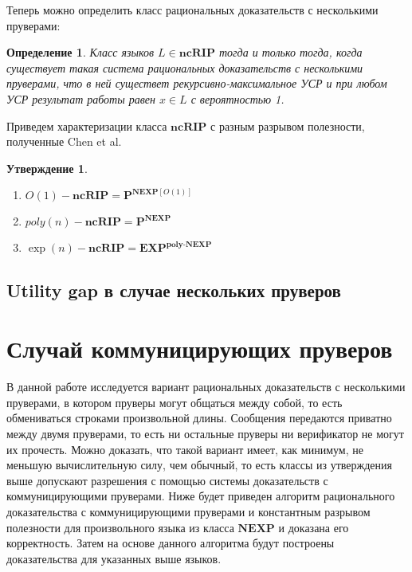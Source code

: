 \documentclass[14pt, a4paper, russian]{report}
\newtheorem{definition}{\indent Определение}
\newtheorem{proposition}{\indent Утверждение}
\begin{document}
        Теперь можно определить класс рациональных доказательств с несколькими пруверами:

        \begin{definition}
            Класс языков $L \in \textbf{ncRIP}$ тогда и только тогда, когда существует такая система рациональных доказательств с несколькими пруверами, что в ней существет рекурсивно-максимальное УСР и при любом УСР результат работы равен $x \in L$ с вероятностью 1.
        \end{definition}

        Приведем характеризации класса $\textbf{ncRIP}$ с разным разрывом полезности, полученные Chen et al. 

        \begin{proposition}
            \begin{enumerate}
                \item $ O(1)-\textbf{ncRIP} = {\textbf{P}}^{\textbf{NEXP}[O(1)] } $
                \item $\textit{poly}(n)-\textbf{ncRIP} = \textbf{P}^{\textbf{NEXP}} $
                \item $\exp(n)-\textbf{ncRIP} = \textbf{EXP}^{\textbf{poly-NEXP}} $
            \end{enumerate}
        \end{proposition}
        \section{Utility gap в случае нескольких пруверов}


        \chapter{Случай коммуницирующих пруверов}

        В данной работе исследуется вариант рациональных доказательств с несколькими пруверами, в котором пруверы могут общаться между собой, то есть обмениваться строками произвольной длины. Сообщения передаются приватно между двумя пруверами, то есть ни остальные пруверы ни верификатор не могут их прочесть. Можно доказать, что такой вариант имеет, как минимум, не меньшую вычислительную силу, чем обычный, то есть классы из утверждения выше допускают разрешения с помощью системы доказательств с коммуницирующими пруверами. Ниже будет приведен алгоритм рационального доказательства с коммуницирующими пруверами и константным разрывом полезности для произвольного языка из класса $\textbf{NEXP}$ и доказана его корректность. Затем на основе данного алгоритма будут построены доказательства для указанных выше языков.
\end{document}

